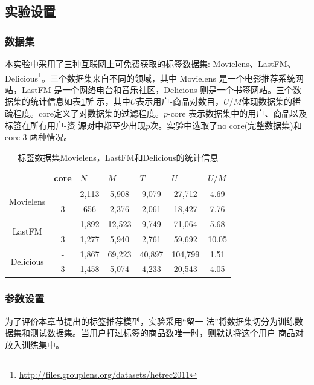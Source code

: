\subsection{实验设置}

\subsubsection{数据集}
本实验中采用了三种互联网上可免费获取的标签数据集: Movielens、LastFM、Delicious\footnote{\url{http://files.grouplens.org/datasets/hetrec2011}}。三个数据集来自不同的领域，其中 Movielens 是一个电影推荐系统网站，LastFM 是一个网络电台和音乐社区，Delicious 则是一个书签网站。三个数据集的统计信息如表\ref{tab-wpitf-datasets}所 示，其中$U$表示用户-商品对数目，$U/M$体现数据集的稀疏程度。core定义了对数据集的过滤程度。$p$-core 表示数据集中的用户、商品以及标签在所有用户-资 源对中都至少出现$p$次。实验中选取了no core(完整数据集)和 core 3 两种情况。


\begin{table}[H]
  \centering
  \caption{标签数据集Movielens，LastFM和Delicious的统计信息}
      	  \label{tab-wpitf-datasets}
    \begin{tabular}{|c||c|c|c|c|c|c|}
    \hline
    \multicolumn{1}{|l||}{ } & \multicolumn{1}{l|}{core } & \multicolumn{1}{l|}{$N$ } & \multicolumn{1}{l|}{$M $} & \multicolumn{1}{l|}{$T$ } & \multicolumn{1}{l|}{$U$ } & \multicolumn{1}{l|}{$U/M$} \bigstrut\\
    \hline
    \hline
    \multirow{2}[4]{*}{Movielens } & -     & 2,113 & 5,908 & 9,079 & 27,712 & 4.69 \bigstrut\\
\cline{2-7}          & 3     & 656   & 2,376 & 2,061 & 18,427 & 7.76 \bigstrut\\
    \hline
    \multirow{2}[4]{*}{LastFM } & -     & 1,892 & 12,523 & 9,749 & 71,064 & 5.68\bigstrut \\
\cline{2-7}          & 3     & 1,277 & 5,940 & 2,761 & 59,692 & 10.05 \bigstrut\\
    \hline
    \multirow{2}[4]{*}{Delicious } & -     & 1,867 & 69,223 & 40,897 & 104,799 & 1.51 \bigstrut\\
\cline{2-7}          & 3     & 1,458 & 5,074 & 4,233 & 20,543 & 4.05 \bigstrut\\
    \hline
    \end{tabular}%
\end{table}%


\subsubsection{参数设置}
为了评价本章节提出的标签推荐模型，实验采用“留一 法”将数据集切分为训练数据集和测试数据集。当用户打过标签的商品数唯一时，则默认将这个用户-商品对放入训练集中。

